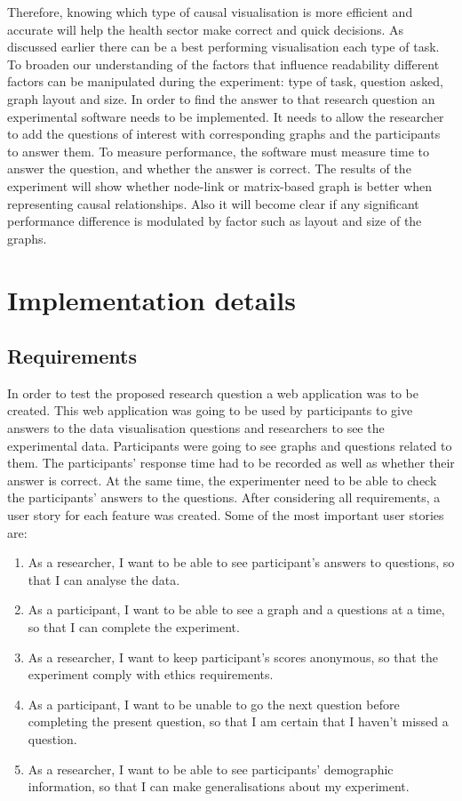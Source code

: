\documentclass{l4proj}
\begin{document}
Therefore, knowing which type of causal visualisation is more efficient and accurate will help the health sector make correct and quick decisions. As discussed earlier there can be a best performing visualisation each type of task. To broaden our understanding of the factors that influence readability different factors can be manipulated during the experiment: type of task, question asked, graph layout and size. In order to find the answer to that research question an experimental software needs to be implemented. It needs to allow the researcher to add the questions of interest with corresponding graphs and the participants to answer them. To measure performance, the software must measure time to answer the question, and whether the answer is correct. The results of the experiment will show whether node-link or matrix-based graph is better when representing causal relationships. Also it will become clear if any significant performance difference is modulated by factor such as layout and size of the graphs. 

\chapter{Implementation details}

\section{Requirements}

In order to test the proposed research question a web application was to be created. This web application was going to be used by participants to give answers to the data visualisation questions and researchers to see the experimental data. Participants were going to see graphs and questions related to them. The participants' response time had to be recorded as well as whether their answer is correct. At the same time, the experimenter need to be able to check the participants' answers to the questions. After considering all requirements, a user story for each feature was created. Some of the most important user stories are:

\begin{enumerate}
   \item As a researcher, I want to be able to see participant's answers to questions, so that I can analyse the data.
   \item As a participant, I want to be able to see a graph and a questions at a time, so that I can complete the experiment.
   \item As a researcher, I want to keep participant's scores anonymous, so that the experiment comply with ethics requirements.
   \item As a participant, I want to be unable to go the next question before completing the present question, so that I am certain that I haven't missed a question.
   \item As a researcher, I want to be able to see participants' demographic information, so that I can make generalisations about my experiment.
\end{enumerate}
\end{document}
